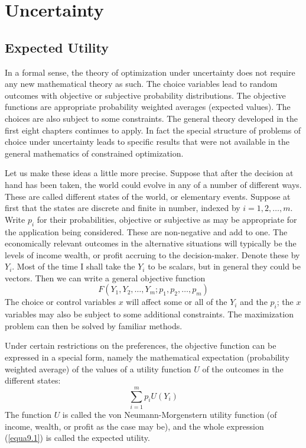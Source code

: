 \chapter{Uncertainty}

\section*{Expected Utility}

In a formal sense, the theory of optimization under uncertainty does not require any new mathematical theory as such. The choice variables lead to random outcomes with objective or subjective probability distributions. The objective functions are appropriate probability weighted averages (expected values). The choices are also subject to some constraints. The general theory developed in the first eight chapters continues to apply. In fact the special structure of problems of choice under uncertainty leads to specific results that were not available in the general mathematics of constrained optimization.

Let us make these ideas a little more precise. Suppose that after the decision at hand has been taken, the world could evolve in any of a number of different ways. These are called different states of the world, or elementary events. Suppose at first that the states are discrete and finite in number, indexed by $i=1,2,\dots,m$. Write $p_i$ for their probabilities, objective or subjective as may be appropriate for the application being considered. These are non-negative and add to one. The economically relevant outcomes in the alternative situations will typically be the levels of income wealth, or profit accruing to the decision-maker. Denote these by $Y_i$. Most of the time I shall take the $Y_i$ to be scalars, but in general they could be vectors. Then we can write a general objective function
\begin{equation*}
F(Y_1, Y_2,\dots, Y_m; p_1, p_2, \dots, p_m)
\end{equation*}
The choice or control variables $x$ will affect some or all of the $Y_i$ and the $p_i$; the $x$ variables may also be subject to some additional constraints. The maximization problem can then be solved by familiar methods.

Under certain restrictions on the preferences, the objective function can be expressed in a special form, namely the mathematical expectation (probability weighted average) of the values of a utility function $U$ of the outcomes in the different states:
\begin{equation} \label{equa9.1}
 \sum\limits_{i=1}^m p_i U(Y_i)
\end{equation}
The function $U$ is called the von Neumann-Morgenstern utility function (of income, wealth, or profit as the case may be), and the whole expression (\ref{equa9.1}) is called the expected utility.

